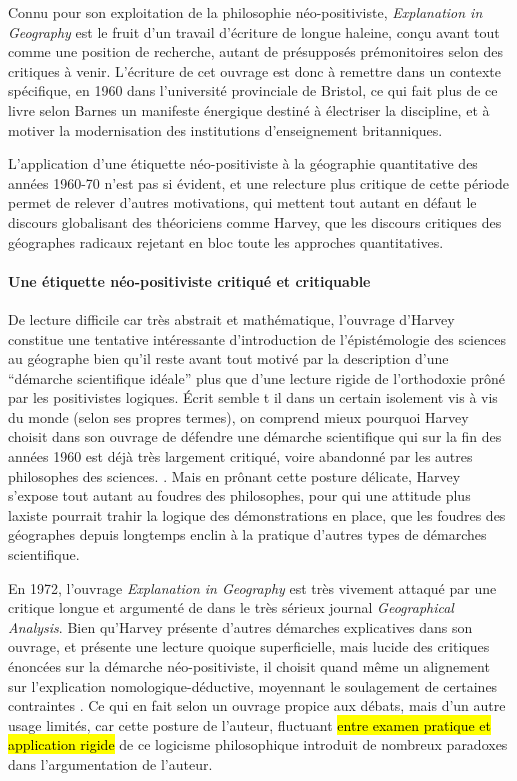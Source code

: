 Connu pour son exploitation de la philosophie néo-positiviste, \textit{Explanation in Geography} est le fruit d'un travail d'écriture de longue haleine, conçu avant tout comme une position de recherche, autant de présupposés prémonitoires selon \textcite[47]{Barnes2006} des critiques à venir. L'écriture de cet ouvrage est donc à remettre dans un contexte spécifique, en 1960 dans l'université provinciale de Bristol, ce qui fait plus de ce livre selon Barnes \autocite[31-36]{Barnes2006} un manifeste énergique destiné à électriser la discipline, et à motiver la modernisation des institutions d'enseignement britanniques.

L'application d'une étiquette néo-positiviste à la géographie quantitative des années 1960-70 n'est pas si évident, et une relecture plus critique de cette période permet de relever d'autres motivations, qui mettent tout autant en défaut le discours globalisant des théoriciens comme Harvey, que les discours critiques des géographes radicaux rejetant en bloc toute les approches quantitatives.

\paragraph{Une étiquette néo-positiviste critiqué et critiquable}

De lecture difficile car très abstrait et mathématique, l'ouvrage d'Harvey constitue une tentative intéressante d'introduction de l'épistémologie des sciences au géographe bien qu'il reste avant tout motivé par la description d'une \enquote{démarche scientifique idéale} plus que d'une lecture rigide de l'orthodoxie prôné par les positivistes logiques. Écrit semble t il dans un certain isolement vis à vis du monde (selon ses propres termes), on comprend mieux pourquoi Harvey choisit dans son ouvrage de défendre une démarche scientifique qui sur la fin des années 1960 est déjà très largement critiqué, voire abandonné par les autres philosophes des sciences. \autocite[147]{Ouelbani2006}. Mais en prônant cette posture délicate, Harvey s'expose tout autant au foudres des philosophes, pour qui une attitude plus laxiste pourrait trahir la logique des démonstrations en place, que les foudres des géographes depuis longtemps enclin à la pratique d'autres types de démarches scientifique.


En 1972, l'ouvrage \textit{Explanation in Geography} est très vivement attaqué par une critique longue et argumenté de \textcite{Gale1972} dans le très sérieux journal \textit{Geographical Analysis}. Bien qu'Harvey présente d'autres démarches explicatives dans son ouvrage, et présente une lecture quoique superficielle, mais lucide des critiques énoncées sur la démarche néo-positiviste, il choisit quand même un alignement sur l'explication nomologique-déductive, moyennant le soulagement de certaines contraintes \autocite[39-40]{Paterson1984}. Ce qui en fait selon \textcite{Gale1972} un ouvrage propice aux débats, mais d'un autre usage limités, car cette posture de l'auteur, fluctuant \hl{entre examen pratique et application rigide} de ce logicisme philosophique introduit de nombreux paradoxes dans l'argumentation de l'auteur.

